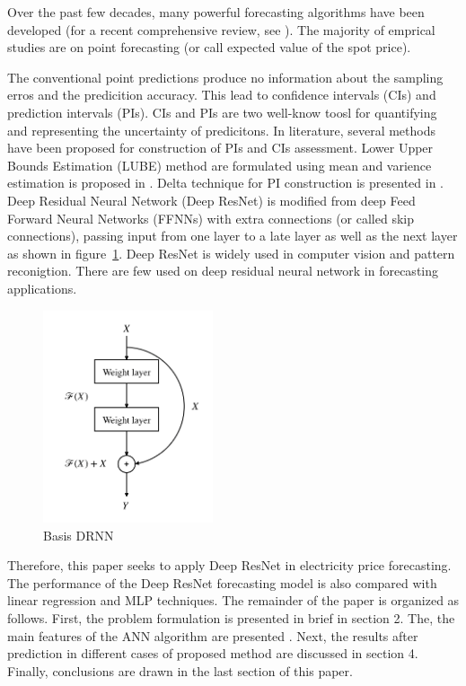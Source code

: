 \documentclass[review]{elsarticle}
\begin{document}
  Over the past few decades, many powerful forecasting algorithms have been developed (for a recent comprehensive review, see \cite{Weron2014}). The majority of emprical studies are on point forecasting (or call expected value of the spot price).

  The conventional point predictions produce no information about the sampling erros and the predicition accuracy. This lead to confidence intervals (CIs) and prediction intervals (PIs). CIs and PIs are two well-know toosl for quantifying and representing the uncertainty of predicitons. In literature, several methods have been proposed for construction of PIs and CIs assessment. Lower Upper Bounds Estimation (LUBE) method are formulated using mean and varience estimation is proposed in \cite{Khosravi2011}. Delta technique for PI construction is presented in \cite{KhosraviA2010}.
  Deep Residual Neural Network (Deep ResNet) is modified from deep Feed Forward Neural Networks (FFNNs) with extra connections (or called skip connections), passing input from one layer to a late layer as well as the next layer as shown in figure~\ref{Fig:Basic_DRNN}. Deep ResNet is widely used in computer vision and pattern reconigtion. There are few used on deep residual neural network in forecasting applications.

  \begin{figure}[H]
    \caption{Basis DRNN}
    \label{Fig:Basic_DRNN}
    \includegraphics[width=5cm]{basic_DRNN}
    \centering
  \end{figure}
  Therefore, this paper seeks to apply Deep ResNet in electricity price forecasting. The performance of the Deep ResNet forecasting model is also compared with linear regression and MLP techniques.
  The remainder of the paper is organized as follows. First, the problem formulation is presented in brief in section 2. The, the main features of the ANN algorithm are presented . Next, the results after prediction in different cases of proposed method  are discussed in section 4. Finally, conclusions are drawn in the last section of this paper.
\end{document}
